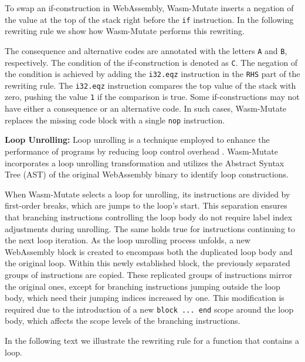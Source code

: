 \documentclass[a4paper,fleqn]{cas-dc}
\newcommand{\tool}{{\sc Wasm-Mutate}\xspace}
\begin{document}

To swap an if-construction in WebAssembly, \tool inserts a negation of the value at the top of the stack right before the \texttt{if} instruction.
In the following rewriting rule we show how \tool performs this rewriting.

The consequence and alternative codes are annotated with the letters \texttt{A} and \texttt{B}, respectively.
The condition of the if-construction is denoted as \texttt{C}.
The negation of the condition is achieved by adding the \texttt{i32.eqz} instruction in the \texttt{RHS} part of the rewriting rule.
The \texttt{i32.eqz} instruction compares the top value of the stack with zero, pushing the value \texttt{1} if the comparison is true.
Some if-constructions may not have either a consequence or an alternative code.
In such cases, \tool replaces the missing code block with a single \texttt{nop} instruction.

\textbf{Loop Unrolling:} 
Loop unrolling is a technique employed to enhance the performance of programs by reducing loop control overhead \cite{dongarra1979unrolling}. 
\tool incorporates a loop unrolling transformation and utilizes the Abstract Syntax Tree (AST) of the original WebAssembly binary to identify loop constructions. 

When \tool selects a loop for unrolling, its instructions are divided by first-order breaks, which are jumps to the loop's start. This separation ensures that branching instructions controlling the loop body do not require label index adjustments during unrolling. The same holds true for instructions continuing to the next loop iteration.
As the loop unrolling process unfolds, a new WebAssembly block is created to encompass both the duplicated loop body and the original loop. 
Within this newly established block, the previously separated groups of instructions are copied. 
These replicated groups of instructions mirror the original ones, except for branching instructions jumping outside the loop body, which need their jumping indices increased by one. This modification is required due to the introduction of a new \texttt{block ... end} scope around the loop body, which affects the scope levels of the branching instructions.

In the following text we illustrate the rewriting rule for a function that contains a loop. 

\end{document}
